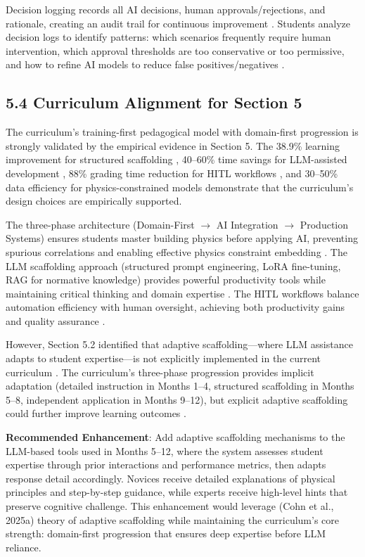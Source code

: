 \documentclass[12pt,a4paper]{article}
\begin{document}
Decision logging records all AI decisions, human approvals/rejections, and rationale, creating an audit trail for continuous improvement \cite{ref331}. Students analyze decision logs to identify patterns: which scenarios frequently require human intervention, which approval thresholds are too conservative or too permissive, and how to refine AI models to reduce false positives/negatives \cite{ref332}.

\subsection{5.4 Curriculum Alignment for Section 5}

The curriculum's training-first pedagogical model with domain-first progression is strongly validated by the empirical evidence in Section 5. The 38.9\% learning improvement for structured scaffolding \cite{ref333}, 40--60\% time savings for LLM-assisted development \cite{ref334}, 88\% grading time reduction for HITL workflows \cite{ref335}, and 30--50\% data efficiency for physics-constrained models \cite{ref336} demonstrate that the curriculum's design choices are empirically supported.

The three-phase architecture (Domain-First $\rightarrow$ AI Integration $\rightarrow$ Production Systems) ensures students master building physics before applying AI, preventing spurious correlations and enabling effective physics constraint embedding \cite{ref337}. The LLM scaffolding approach (structured prompt engineering, LoRA fine-tuning, RAG for normative knowledge) provides powerful productivity tools while maintaining critical thinking and domain expertise \cite{ref338}. The HITL workflows balance automation efficiency with human oversight, achieving both productivity gains and quality assurance \cite{ref339}.

However, Section 5.2 identified that adaptive scaffolding---where LLM assistance adapts to student expertise---is not explicitly implemented in the current curriculum \cite{ref340}. The curriculum's three-phase progression provides implicit adaptation (detailed instruction in Months 1--4, structured scaffolding in Months 5--8, independent application in Months 9--12), but explicit adaptive scaffolding could further improve learning outcomes \cite{ref341}.

\textbf{Recommended Enhancement}: Add adaptive scaffolding mechanisms to the LLM-based tools used in Months 5--12, where the system assesses student expertise through prior interactions and performance metrics, then adapts response detail accordingly. Novices receive detailed explanations of physical principles and step-by-step guidance, while experts receive high-level hints that preserve cognitive challenge. This enhancement would leverage (Cohn et al., 2025a) theory of adaptive scaffolding \cite{ref342} while maintaining the curriculum's core strength: domain-first progression that ensures deep expertise before LLM reliance.
\end{document}
